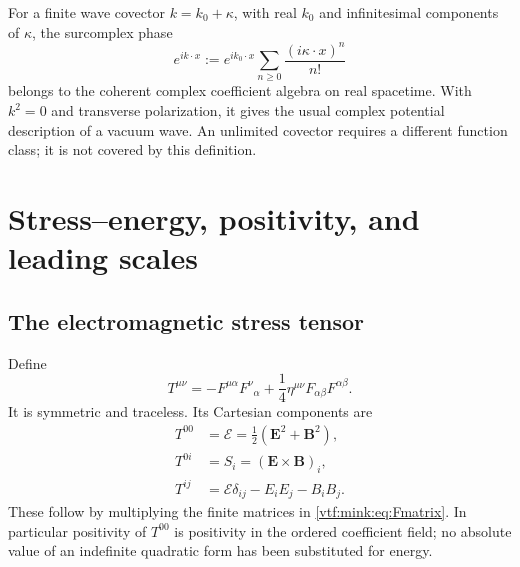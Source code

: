 \documentclass[11pt,letterpaper]{article}
\theoremstyle{definition}
\theoremstyle{remark}
\begin{document}
For a finite wave covector $k=k_0+\kappa$, with real $k_0$ and infinitesimal components of $\kappa$, the surcomplex phase
\begin{equation}
 e^{i k\cdot x}:=e^{i k_0\cdot x}
                  \sum_{n\geq0}\frac{(i\kappa\cdot x)^n}{n!}
\end{equation}
belongs to the coherent complex coefficient algebra on real spacetime. With $k^2=0$ and transverse polarization, it gives the usual complex potential description of a vacuum wave. An unlimited covector requires a different function class; it is not covered by this definition.

\section{Stress--energy, positivity, and leading scales}\label{vtf:mink:sec:energy}

\subsection{The electromagnetic stress tensor}
Define
\begin{equation}\label{vtf:mink:eq:stress}
 T^{\mu\nu}
 =-F^{\mu\alpha}F^{\nu}{}_{\alpha}
   +\frac14\eta^{\mu\nu}F_{\alpha\beta}F^{\alpha\beta}.
\end{equation}
It is symmetric and traceless. Its Cartesian components are
\begin{align}
 T^{00}&=\mathcal E=\frac12(\mathbf E^2+\mathbf B^2),\label{vtf:mink:eq:energydensity}\\
 T^{0i}&=S_i=(\mathbf E\times\mathbf B)_i,\\
 T^{ij}&=\mathcal E\delta_{ij}-E_iE_j-B_iB_j.\label{vtf:mink:eq:stressspatial}
\end{align}
These follow by multiplying the finite matrices in \cref{vtf:mink:eq:Fmatrix}. In particular positivity of $T^{00}$ is positivity in the ordered coefficient field; no absolute value of an indefinite quadratic form has been substituted for energy.
\end{document}
